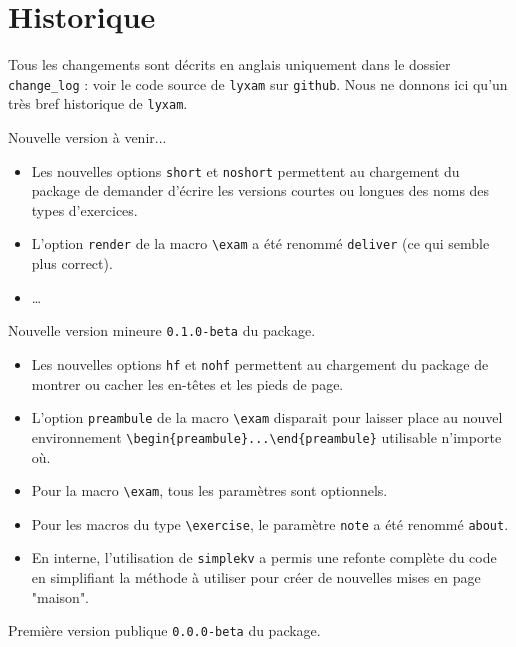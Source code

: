 \documentclass[12pt,a4paper]{scrartcl}
\begin{document}
\section{Historique}

Tous les changements sont décrits en anglais uniquement dans le dossier \verb+change_log+ : voir le code source de \verb+lyxam+ sur \verb+github+. Nous ne donnons ici qu'un très bref historique de \verb+lyxam+.

\begin{description}[leftmargin=1em]
	\setlength\itemsep{1em}

	\item[À SUIVRE !] Nouvelle version à venir...
	\begin{itemize}
        \item Les nouvelles options \verb+short+ et \verb+noshort+ permettent au chargement du package de demander d'écrire les versions courtes ou longues des noms des types d'exercices.

        \item L'option \verb+render+ de la macro \verb+\exam+ a été renommé \verb+deliver+ (ce qui semble plus correct).
        \item \dots
	\end{itemize}

	\item[2017-11-12] Nouvelle version mineure \verb+0.1.0-beta+ du package.
	\begin{itemize}
        \item Les nouvelles options \verb+hf+ et \verb+nohf+ permettent au chargement du package de montrer ou cacher les en-têtes et les pieds de page.

        \item L'option \verb+preambule+ de la macro \verb+\exam+ disparait pour laisser place au nouvel environnement \verb+\begin{preambule}...\end{preambule}+ utilisable n'importe où.

        \item Pour la macro \verb+\exam+, tous les paramètres sont optionnels.

        \item Pour les macros du type \verb+\exercise+, le paramètre \verb+note+ a été renommé \verb+about+.

		\item En interne, l'utilisation de \verb+simplekv+ a permis une refonte complète du code en simplifiant la méthode à utiliser pour créer de nouvelles mises en page "maison".
	\end{itemize}

	\item[2017-11-03] Première version publique \verb+0.0.0-beta+ du package.
\end{description}
\end{document}
